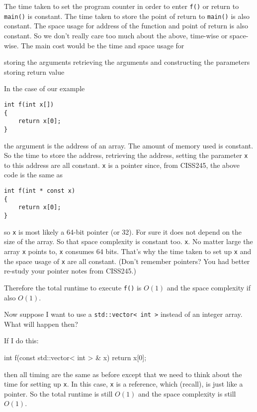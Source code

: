 The time taken to set the program counter in order to enter \verb!f()! or return to
\verb!main()! is constant.
The time taken to store the point of return to \verb!main()! is also constant.
The space usage for address of the function and point of return is also constant.
So we don't really care too much about the above, time-wise or space-wise.
The main cost would be the time and space usage for
\begin{tightlist}
  \li storing the arguments
  \li retrieving the arguments and constructing the parameters
  \li storing return value
\end{tightlist}

In the case of our example
\begin{Verbatim}[frame=single,fontsize=\footnotesize]
int f(int x[])
{
    return x[0];
}
\end{Verbatim}
the argument is the address of an array.
The amount of memory used is constant.
So the time to store the address,
retrieving the address, setting the parameter \verb!x! to this address
are all constant.
\verb!x! is a pointer since, from CISS245, the above code is the same
as
\begin{Verbatim}[frame=single,fontsize=\footnotesize]
int f(int * const x)
{
    return x[0];
}
\end{Verbatim}
so \verb!x! is most likely a 64-bit pointer (or 32).
For sure it does not depend on the size of the array.
So that space complexity is constant too.
\verb!x!.
No matter large the array \verb!x! points to, \verb!x! consumes
64 bits.
That's why the time taken to set up \verb!x!
and the space usage of \verb!x! are all constant.
(Don't remember pointers?
You had better re-study your pointer notes from CISS245.)

Therefore the total runtime to execute \verb!f()! is $O(1)$
and the space complexity if also $O(1)$.

Now suppose I want to use a \verb!std::vector< int >! instead of an
integer array.
What will happen then?

If I do this:
\begin{console}
int f(const std::vector< int > & x)
{
    return x[0];
}
\end{console}
then all timing are the same as before except that we need to think about
the time for setting up \verb!x!.
In this case, \verb!x! is a reference, which (recall), is just like a pointer.
So the total runtime is still $O(1)$ and the space complexity is still $O(1)$.

